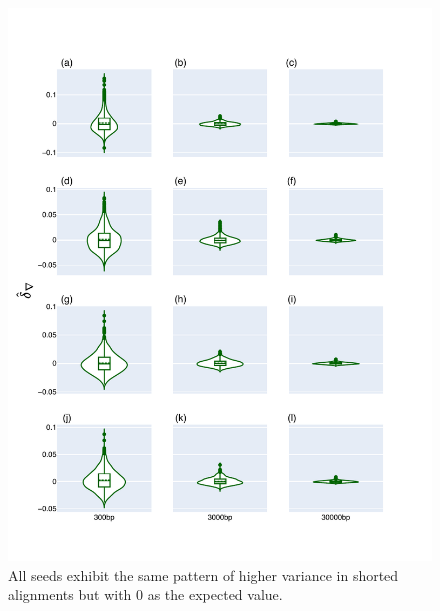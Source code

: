 \begin{figure}[!ht]
\centering
\includegraphics[width=\textwidth]{figures/plots/synthetic/d-conv/all_seeds.pdf}
\caption{All seeds exhibit the same pattern of higher variance in shorted alignments but with 0 as the expected value.}
\label{fig:synthetic/d-conv/all_seeds}
\end{figure}